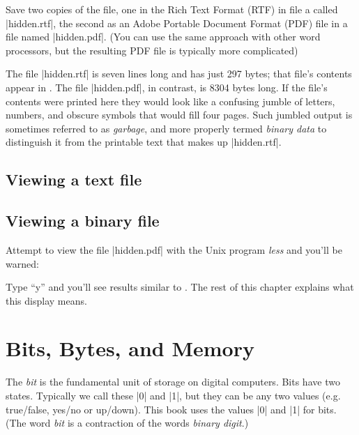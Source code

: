 Save two copies of the file, one in the Rich Text Format (RTF) in file
a called |hidden.rtf|, the second as an Adobe Portable Document Format
(PDF) file in a file named |hidden.pdf|. (You can use
the same approach with other word processors, but the resulting PDF
file is typically more complicated) 



The file |hidden.rtf| is seven lines long and has just 297 bytes; that
file's contents appear in . The file |hidden.pdf|, in
contrast, is 8304 bytes long. If the file's contents were printed here
they would look like a confusing jumble of letters, numbers, and
obscure symbols that would fill four pages. Such jumbled output is 
sometimes referred to as \emph{garbage}, and more properly termed
\emph{binary data} to distinguish it from the printable text that
makes up |hidden.rtf|. 




\subsection{Viewing a text file}
\subsection{Viewing a binary file}

Attempt to view the file |hidden.pdf| with the
Unix program \emph{less} and you'll be warned:


Type ``y'' and you'll see results similar to
. The rest of this chapter explains what
this display means.

\section{Bits, Bytes, and Memory}\label{sec:numbers}
The \emph{bit} is the fundamental unit of storage on digital computers. Bits
have two states. Typically we call these |0| and |1|, but they can be any
two values (e.g. true/false, yes/no or up/down). This book 
uses the values |0| and |1| for bits. (The word \emph{bit} is a contraction of the words \emph{binary digit}.)


